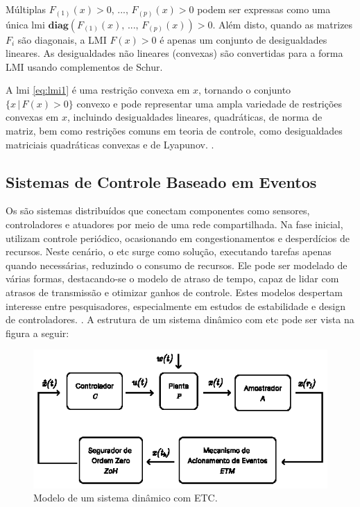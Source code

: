 Múltiplas   $F_{(1)}(x) > 0, \, ..., \, F_{(p)}(x) > 0$ podem ser expressas como uma única \acrshort{lmi} $\mathbf{diag}(F_{(1)}(x), \, ..., \, F_{(p)}(x)) > 0$. Além disto, quando as matrizes $F_i$ são diagonais, a LMI $F(x) > 0$ é apenas um conjunto de desigualdades lineares. As desigualdades não lineares (convexas) são convertidas para a forma LMI usando complementos de Schur.

A \acrshort{lmi} \eqref{eq:lmi1} é uma restrição convexa em $x$, tornando o conjunto $\{x \, | \, F(x) > 0\}$ convexo e pode representar uma ampla variedade de restrições convexas em $x$, incluindo desigualdades lineares, quadráticas, de norma de matriz, bem como restrições comuns em teoria de controle, como desigualdades matriciais quadráticas convexas e de Lyapunov. \cite{boyd1994}.


\subsection{Sistemas de Controle Baseado em Eventos}

Os  são sistemas distribuídos que conectam componentes como sensores, controladores e atuadores por meio de uma rede compartilhada. Na fase inicial, utilizam controle periódico, ocasionando em congestionamentos e desperdícios de recursos. Neste cenário, o \acrshort{etc} surge como solução, executando tarefas apenas quando necessárias, reduzindo o consumo de recursos. Ele pode ser modelado de várias formas, destacando-se o modelo de atraso de tempo, capaz de lidar com atrasos de transmissão e otimizar ganhos de controle. Estes modelos despertam interesse entre pesquisadores, especialmente em estudos de estabilidade e design de controladores. \cite{peng2018}. A estrutura de um sistema dinâmico com \acrshort{etc} pode ser vista na figura a seguir:

\begin{figure}[H]
  \centering
  \includegraphics[scale=2.]{figuras/etc-model.eps}
  \caption{Modelo de um sistema dinâmico com ETC.}
  \label{fig:etc-model}
\end{figure}

